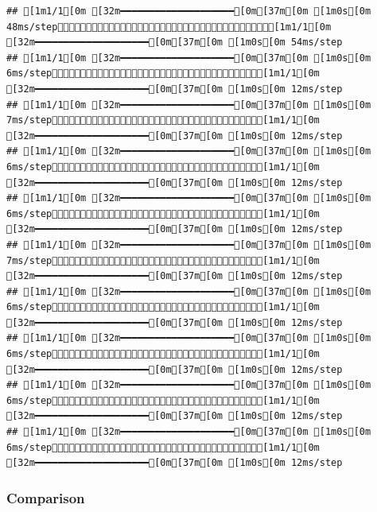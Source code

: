 \documentclass[
]{article}
\begin{document}
\begin{verbatim}
## [1m1/1[0m [32m━━━━━━━━━━━━━━━━━━━━[0m[37m[0m [1m0s[0m 48ms/step[1m1/1[0m [32m━━━━━━━━━━━━━━━━━━━━[0m[37m[0m [1m0s[0m 54ms/step
## [1m1/1[0m [32m━━━━━━━━━━━━━━━━━━━━[0m[37m[0m [1m0s[0m 6ms/step[1m1/1[0m [32m━━━━━━━━━━━━━━━━━━━━[0m[37m[0m [1m0s[0m 12ms/step
## [1m1/1[0m [32m━━━━━━━━━━━━━━━━━━━━[0m[37m[0m [1m0s[0m 7ms/step[1m1/1[0m [32m━━━━━━━━━━━━━━━━━━━━[0m[37m[0m [1m0s[0m 12ms/step
## [1m1/1[0m [32m━━━━━━━━━━━━━━━━━━━━[0m[37m[0m [1m0s[0m 6ms/step[1m1/1[0m [32m━━━━━━━━━━━━━━━━━━━━[0m[37m[0m [1m0s[0m 12ms/step
## [1m1/1[0m [32m━━━━━━━━━━━━━━━━━━━━[0m[37m[0m [1m0s[0m 6ms/step[1m1/1[0m [32m━━━━━━━━━━━━━━━━━━━━[0m[37m[0m [1m0s[0m 12ms/step
## [1m1/1[0m [32m━━━━━━━━━━━━━━━━━━━━[0m[37m[0m [1m0s[0m 7ms/step[1m1/1[0m [32m━━━━━━━━━━━━━━━━━━━━[0m[37m[0m [1m0s[0m 12ms/step
## [1m1/1[0m [32m━━━━━━━━━━━━━━━━━━━━[0m[37m[0m [1m0s[0m 6ms/step[1m1/1[0m [32m━━━━━━━━━━━━━━━━━━━━[0m[37m[0m [1m0s[0m 12ms/step
## [1m1/1[0m [32m━━━━━━━━━━━━━━━━━━━━[0m[37m[0m [1m0s[0m 6ms/step[1m1/1[0m [32m━━━━━━━━━━━━━━━━━━━━[0m[37m[0m [1m0s[0m 12ms/step
## [1m1/1[0m [32m━━━━━━━━━━━━━━━━━━━━[0m[37m[0m [1m0s[0m 6ms/step[1m1/1[0m [32m━━━━━━━━━━━━━━━━━━━━[0m[37m[0m [1m0s[0m 12ms/step
## [1m1/1[0m [32m━━━━━━━━━━━━━━━━━━━━[0m[37m[0m [1m0s[0m 6ms/step[1m1/1[0m [32m━━━━━━━━━━━━━━━━━━━━[0m[37m[0m [1m0s[0m 12ms/step
\end{verbatim}

\subsubsection{Comparison}\label{comparison}
\end{document}
